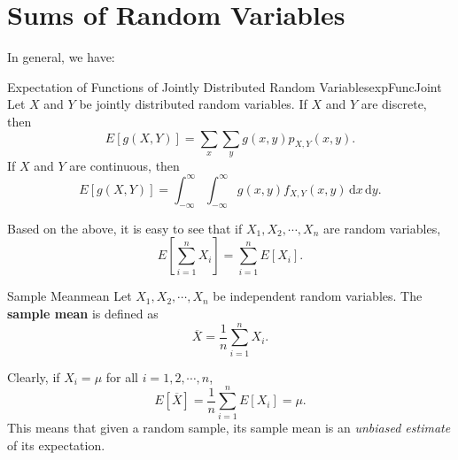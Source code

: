 \documentclass[math]{amznotes}
\theoremstyle{remark}
\begin{document}
\section{Sums of Random Variables}
In general, we have:
\begin{thmbox}{\small Expectation of Functions of Jointly Distributed Random Variables}{expFuncJoint}
    Let $X$ and $Y$ be jointly distributed random variables. If $X$ and $Y$ are discrete, then 
    \begin{equation*}
        E[g(X, Y)] = \sum_{x}\sum_{y}g(x, y)p_{X, Y}(x, y).
    \end{equation*}
    If $X$ and $Y$ are continuous, then 
    \begin{equation*}
        E[g(X, Y)] = \int_{-\infty}^{\infty}\int_{-\infty}^{\infty}\!g(x, y)f_{X, Y}(x, y)\,\mathrm{d}x\,\mathrm{d}y.
    \end{equation*}
\end{thmbox}
Based on the above, it is easy to see that if $X_1, X_2, \cdots, X_n$ are random variables,
\begin{equation*}
    E\left[\sum_{i = 1}^{n}X_i\right] = \sum_{i = 1}^{n}E[X_i].
\end{equation*}
\begin{dfnbox}{Sample Mean}{mean}
    Let $X_1, X_2, \cdots, X_n$ be independent random variables. The {\color{red} \textbf{sample mean}} is defined as
    \begin{equation*}
        \overline{X} = \frac{1}{n}\sum_{i = 1}^{n}X_i.
    \end{equation*}
\end{dfnbox}
Clearly, if $X_i = \mu$ for all $i = 1, 2, \cdots, n$,
\begin{equation*}
    E\left[\overline{X}\right] = \frac{1}{n}\sum_{i = 1}^{n}E[X_i] = \mu.
\end{equation*}
This means that given a random sample, its sample mean is an \textit{unbiased estimate} of its expectation.
\end{document}
